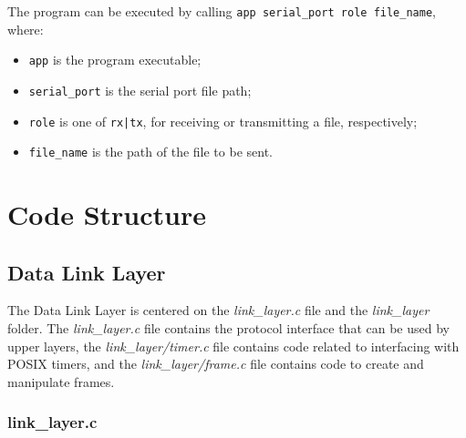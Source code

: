 \documentclass[11pt,a4paper]{article}
\begin{document}
The program can be executed by calling \lstinline{app serial_port role file_name}, where:

\begin{itemize}
    \item \lstinline{app} is the program executable;
    \item \lstinline{serial_port} is the serial port file path;
    \item \lstinline{role} is one of \lstinline{rx|tx}, for receiving or transmitting a file, respectively;
    \item \lstinline{file_name} is the path of the file to be sent.
\end{itemize}

\section{Code Structure}

\subsection{Data Link Layer}
\label{sec:dll}

The Data Link Layer is centered on the \textit{link\_layer.c} file and the \textit{link\_layer} folder.
The \textit{link\_layer.c} file contains the protocol interface that can be used by upper layers, the \textit{link\_layer/timer.c} file contains code related to interfacing with POSIX timers, and the \textit{link\_layer/frame.c} file contains code to create and manipulate frames.

\subsubsection{link\_layer.c}
\end{document}

